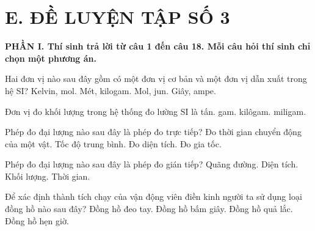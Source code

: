 \section*{E. ĐỀ LUYỆN TẬP SỐ 3}

\noindent\textbf{\large PHẦN I. Thí sinh trả lời từ câu 1 đến câu 18. Mỗi câu hỏi thí sinh chỉ chọn một phương án.}\par\vspace{0.2cm}
\begin{ex}
Hai đơn vị nào sau đây gồm có một đơn vị cơ bản và một đơn vị dẫn xuất trong
hệ SI?
\choice
{Kelvin, mol.}
{Mét, kilogam.}
{\True Mol, jun.}
{Giây, ampe.}
\end{ex}

\begin{ex}
Đơn vị đo khối lượng trong hệ thống đo lường SI là
\choice
{tấn.}
{gam.}
{\True kilôgam.}
{miligam.}
\end{ex}

\begin{ex}
Phép đo đại lượng nào sau đây là phép đo trực tiếp?
\choice
{\True Đo thời gian chuyển động của một vật.}
{Tốc độ trung bình.}
{Đo diện tích.}
{Đo gia tốc.}
\end{ex}

\begin{ex}
Phép đo đại lượng nào sau đây là phép đo gián tiếp?
\choice
{Quãng đường.}
{\True Diện tích.}
{Khối lượng.}
{Thời gian.}
\end{ex}

\begin{ex}
Để xác định thành tích chạy của vận động viên điền kinh người ta sử dụng
loại đồng hồ nào sau đây?
\choice
{Đồng hồ đeo tay.}
{\True Đồng hồ bấm giây.}
{Đồng hồ quả lắc.}
{Đồng hồ hẹn giờ.}
\end{ex}

